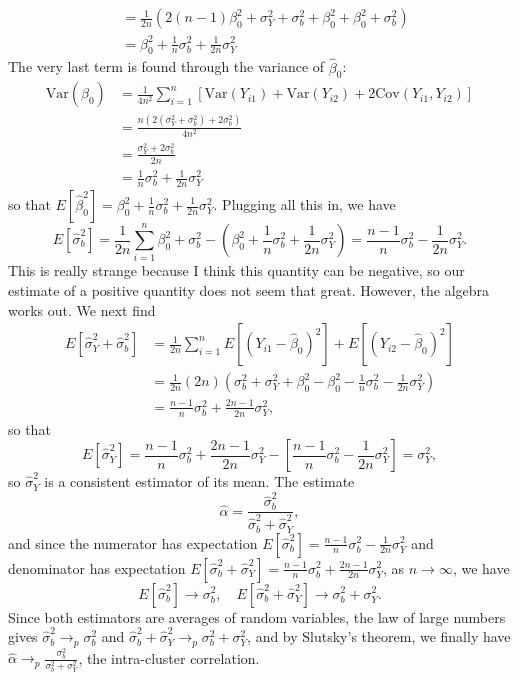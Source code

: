 \documentclass[11pt]{article}
\newcommand{\Var}{\mathrm{Var}}
\newcommand{\Cov}{\mathrm{Cov}}
\begin{document}
\begin{enumerate}
\begin{align*}
		&= \frac{1}{2n}(2(n-1)\beta_0^2 + \sigma^2_Y + \sigma^2_b + \beta_0^2 + \beta_0^2 + \sigma^2_b) \\
		&= \beta_0^2 + \frac{1}{n} \sigma^2_b + \frac{1}{2n}\sigma^2_Y
	\end{align*}
	The very last term is found through the variance of $\widehat{\beta}_0$:
	\begin{align*}
		\Var(\widehat{\beta}_0) &= \frac{1}{4n^2} \sum_{i=1}^n[\Var(Y_{i1}) + \Var(Y_{i2}) + 2\Cov(Y_{i1},Y_{i2})] \\
		&= \frac{n(2(\sigma^2_Y + \sigma^2_b)+2\sigma^2_b)}{4n^2} \\
		&= \frac{\sigma^2_Y + 2\sigma^2_b}{2n} \\
		&= \frac{1}{n}\sigma^2_b + \frac{1}{2n}\sigma^2_Y
	\end{align*}
	so that $E[\widehat{\beta}_0^2] = \beta_0^2 + \frac{1}{n}\sigma^2_b + \frac{1}{2n}\sigma^2_Y $. Plugging all this in, we have
	\[
		E[\widehat{\sigma}_b^2] = \frac{1}{2n}\sum_{i=1}^n \beta_0^2 + \sigma^2_b - (\beta_0^2 + \frac{1}{n}\sigma^2_b + \frac{1}{2n}\sigma^2_Y) = \frac{n-1}{n}\sigma^2_b - \frac{1}{2n}\sigma^2_Y.
	\]	
	This is really strange because I think this quantity can be negative, so our estimate of a positive quantity does not seem that great. However, the algebra works out. We next find
	\begin{align*}
		E[\widehat{\sigma}_Y^2 + \widehat{\sigma}^2_b] &= \frac{1}{2n}\sum_{i=1}^n E[(Y_{i1}-\widehat{\beta}_0)^2] + E[(Y_{i2}-\widehat{\beta}_0)^2] 
		\\ 
		&= \frac{1}{2n}(2n)(\sigma^2_b + \sigma^2_Y + \beta_0^2 - \beta_0^2 - \frac{1}{n}\sigma^2_b - \frac{1}{2n}\sigma^2_Y) \\
		&= \frac{n-1}{n}\sigma^2_b + \frac{2n-1}{2n}\sigma^2_Y,
	\end{align*}
	so that
	\[
		E[\widehat{\sigma}^2_Y] = \frac{n-1}{n}\sigma^2_b + \frac{2n-1}{2n}\sigma^2_Y - \left[\frac{n-1}{n}\sigma^2_b - \frac{1}{2n}\sigma^2_Y\right] = \sigma^2_Y,
	\]
	so $\widehat{\sigma}^2_Y$ is a consistent estimator of its mean. The estimate
	\[
		\widehat{\alpha} = \frac{\widehat{\sigma}^2_b}{\widehat{\sigma}^2_b + \widehat{\sigma}^2_Y},
	\]
	and since the numerator has expectation $E[\widehat{\sigma}_b^2] = \frac{n-1}{n}\sigma^2_b - \frac{1}{2n}\sigma^2_Y$ and denominator has expectation $E[\widehat{\sigma}^2_b + \widehat{\sigma}^2_Y]= \frac{n-1}{n}\sigma^2_b + \frac{2n-1}{2n}\sigma^2_Y$, as $n\to\infty$, we have
	\[
		E[\widehat{\sigma}^2_b] \to \sigma^2_b,\quad E[\widehat{\sigma}^2_b + \widehat{\sigma}^2_Y] \to \sigma^2_b + \sigma^2_Y.
	\]
	Since both estimators are averages of random variables, the law of large numbers gives $\widehat{\sigma}^2_b \to_p \sigma^2_b$ and $\widehat{\sigma}^2_b + \widehat{\sigma}^2_Y \to_p \sigma^2_b + \sigma^2_Y$, and by Slutsky's theorem, we finally have $\widehat{\alpha} \to_p \frac{\sigma^2_b}{\sigma^2_b + \sigma^2_Y}$, the intra-cluster correlation.
	\end{enumerate}
\end{document}
